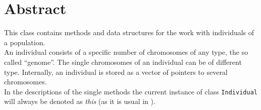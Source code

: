 \section{Abstract}

This class contains methods and data structures for the work
with individuals of a population.\\
An individual consists of a specific number of chromosomes
of any type, the so called ``genome''. The single chromosomes
of an individual can be of different type.
Internally, an individual is stored as a vector of pointers
to several chromosomes.\\
In the descriptions of the single methods the current instance
of class {\tt Individual}
will always be denoted as {\em this} (as it is usual in \cpp).
